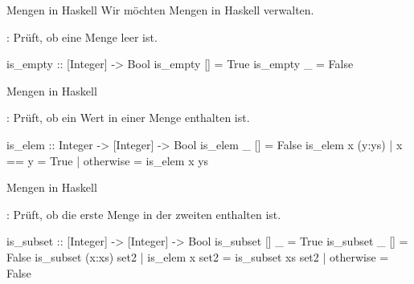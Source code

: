 \begin{frame}[fragile]{Mengen in Haskell}
    Wir möchten Mengen in Haskell verwalten.

    
    \begin{exercise}[a)]
    : Prüft, ob eine Menge leer ist.
    \end{exercise}
    \begin{solve}[a)]
    \begin{plainhaskell}
is_empty :: [Integer] -> Bool
is_empty [] = True
is_empty _ = False
    \end{plainhaskell}
    \end{solve}
\end{frame}
\resetframecounters
\begin{frame}[fragile]{Mengen in Haskell}
    \begin{exercise}[b)]
        : Prüft, ob ein Wert in einer Menge enthalten ist.
        \end{exercise}
        \begin{solve}[b)]
        \begin{plainhaskell}
is_elem :: Integer -> [Integer] -> Bool
is_elem _ [] = False
is_elem x (y:ys)
    | x == y = True
    | otherwise = is_elem x ys
        \end{plainhaskell}
        \end{solve}
\end{frame}
\resetframecounters
\begin{frame}[fragile]{Mengen in Haskell}
    \begin{exercise}[c)]
        : Prüft, ob die erste Menge in der zweiten enthalten ist.
        \end{exercise}
        \begin{solve}[c)]
        \begin{plainhaskell}
is_subset :: [Integer] -> [Integer] -> Bool
is_subset [] _ = True
is_subset _ [] = False
is_subset (x:xs) set2
    | is_elem x set2 = is_subset xs set2
    | otherwise = False
        \end{plainhaskell}
        \end{solve}
\end{frame}
